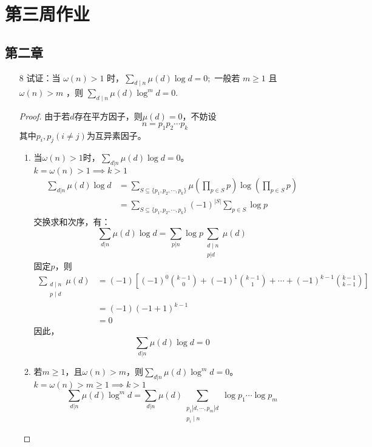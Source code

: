 \section{第三周作业}
\subsection*{第二章}

\begin{enumerate}
    \item[8] 试证：当 $\omega(n)>1$ 时，$\sum_{d \mid n} \mu(d) \log d=0 ;$ 一般若 $m \geqslant 1$ 且 $\omega(n)>m$ ，则 $\sum_{d \mid n} \mu(d) \log ^m d=0$.
    \begin{proof}
        由于若$d$存在平方因子，则$\mu(d)=0$，不妨设
        \[n=p_1p_2\cdots p_k\]
        其中$p_i,p_j(i\neq j)$为互异素因子。
        \begin{enumerate}
            \item 当$\omega(n)>1$时，$\sum\limits_{d|n}\mu(d)\log d=0$。\\
            $k=\omega(n)>1\implies k>1$
            \begin{align*}
                \sum\limits_{d|n}\mu(d)\log d&=\sum\limits_{S\subseteq\{p_1,p_2,\cdots,p_k\}}\mu(\prod\limits_{p\in S}p)\log(\prod\limits_{p\in S}p)\\
                &=\sum\limits_{S\subseteq\{p_1,p_2,\cdots,p_k\}}(-1)^{|S|}\sum\limits_{p\in S}\log p
            \end{align*}
            交换求和次序，有：
            \[\sum\limits_{d|n}\mu(d)\log d=\sum\limits_{p|n}\log p\sum\limits_{\substack{d \mid n \\ p|d}}\mu(d)\]
            固定$p$，则
            \begin{align*}
                \sum\limits_{\substack{d \mid n\\ p \mid d}}\mu(d)&=(-1)\left[(-1)^0\binom{k-1}{0}+(-1)^1\binom{k-1}{1}+\cdots+(-1)^{k-1}\binom{k-1}{k-1}\right]\\
                &=(-1)(-1+1)^{k-1}\\
                &=0
            \end{align*}
            因此，
            \[\sum\limits_{d|n}\mu(d)\log d=0\]
            \item 若$m \geq 1$，且$\omega(n)>m$，则$\sum\limits_{d|n}\mu(d)\log^m d=0$。\\
            $k=\omega(n)>m\geq 1\implies k>1$
            \[\sum\limits_{d|n}\mu(d)\log^m d=\sum\limits_{d|n}\mu(d)\sum\limits_{\substack{
                p_1|d,\cdots,p_m|d \\ p_{i} \mid n}}\log p_1\cdots\log p_m\]

\end{enumerate}
\end{proof}
\end{enumerate}
